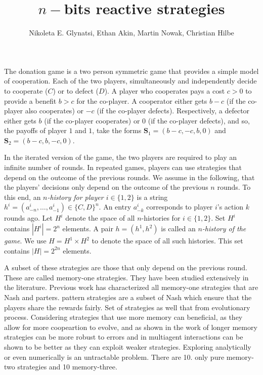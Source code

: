\documentclass{article}
\title{$n-$bits reactive strategies}
\author{Nikoleta E. Glynatsi, Ethan Akin, Martin Nowak, Christian Hilbe}
\date{}
\theoremstyle{definition}
\begin{document}
\maketitle

The donation game is a two person symmetric game that provides a simple model of
cooperation. Each of the two players, simultaneously and independently decide to
cooperate ($C$) or to defect ($D$). A player who cooperates pays a cost \(c >
0\) to provide a benefit \(b > c\) for the co-player. A cooperator either gets
\(b\!-\!c\) (if the co-player also cooperates) or \(-c\) (if the co-player
defects). Respectively, a defector either gets \(b\) (if the co-player
cooperates) or 0 (if the co-player defects), and so, the payoffs of player \(1\)
and \(1\), take the forms $\mathbf{S}_{1} = (b - c, -c, b, 0)$ and
$\mathbf{S}_{2} = (b - c, b, -c, 0)$.

In the iterated version of the game, the two players are required to play an
infinite number of rounds. In repeated games, players can use strategies that
depend on the outcome of the previous rounds. We assume in the following, that the players' decisions only depend on the
outcome of the previous $n$ rounds. To this end, an {\it $n$-history for player
$i \in \{1, 2\}$} is a string $h^i=(a^i_{-n},\ldots,a^i_{-1})\!\in\!\{C,D\}^n$. An entry
$a^i_{-k}$ corresponds to player $i$'s action $k$ rounds ago. Let $H^i$ denote
the space of all $n$-histories for $i \in \{1, 2\}$. Set $H^i$
contains $|H^i|=2^{n}$ elements. A pair $h\!=\!(h^1,h^2)$ is called an {\it
$n$-history of the game}. We use $H=H^1\times H^2$ to denote the space of all
such histories. This set contains $|H|=2^{2n}$ elements.

A subset of these strategies are those that only depend on the
previous round. These are called memory-one strategies. They have been studied
extensively in the literature. Previous work has characterized all memory-one
strategies that are Nash and parters. pattern strategies are a subset of Nash
which ensure that the players share the rewards fairly. Set of strategies as
well that from evolutionary process. Considering strategies that use more
memory can beneficial, as they allow for more coopeartion to evolve, and
as shown in the work of longer memory strategies can be more robust to errors
and in multiagent interactions can be shown to be better as they can exploit
weaker strategies. Exploring analytically or even numerically is an untractable
problem. There are 10. only pure memory-two strategies and 10 memory-three.
\end{document}
